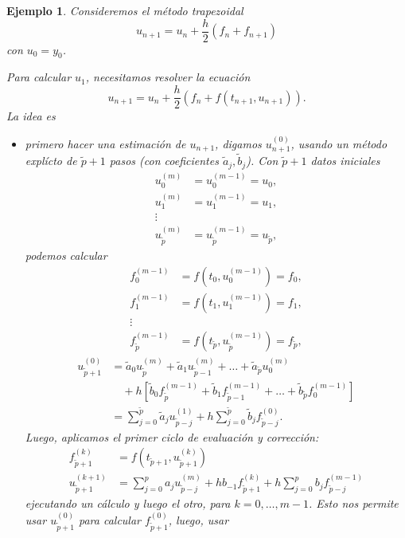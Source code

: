 \documentclass[11pt,letterpaper]{article}
\newtheorem{example}{Ejemplo}
\begin{document}
\begin{example}
  Consideremos el método trapezoidal
  \begin{equation}
    u_{n+1} = u_n + \frac{h}{2}(f_n + f_{n+1})
  \end{equation}
  con $u_0=y_0$.

  Para calcular $u_1$, necesitamos resolver la ecuación
  \begin{equation}
    u_{n+1} = u_n + \frac{h}{2}(f_n + f(t_{n+1},u_{n+1})).
  \end{equation}
  La idea es
  \begin{itemize}
    \item
      primero hacer una estimación de $u_{n+1}$, digamos
      $u_{n+1}^{(0)}$, usando un método explícto de $\tilde p+1$ pasos
      (con coeficientes $\tilde a_j, \tilde b_j$). Con $\tilde p + 1$
      datos iniciales
      \begin{align}
        u^{(m)}_0 &= u^{(m-1)}_0 = u_0, \\
        u^{(m)}_1 &= u^{(m-1)}_1 = u_1, \\
        \vdots \\
        u^{(m)}_{\tilde p} &= u^{(m-1)}_{\tilde p} = u_{\tilde p}
      ,\end{align}
      podemos calcular
      \begin{align}
        f^{(m-1)}_0 &= f(t_0,u^{(m-1)}_0) = f_0, \\
        f^{(m-1)}_1 &= f(t_1,u^{(m-1)}_1) = f_1, \\
        \vdots \\
        f^{(m-1)}_{\tilde p} &= f(t_{\tilde p},u^{(m-1)}_{\tilde p})
        = f_{\tilde p}
      ,\end{align}
      \begin{align}
        u_{\tilde p+1}^{(0)}
        &=
        \tilde a_{0} u_{\tilde p}^{(m)}
        + \tilde a_{1} u_{\tilde p - 1}^{(m)}
        + \dots +
        \tilde a_{\tilde p} u_{0}^{(m)}
        \\
        &\quad
        + h
          [
          \tilde b_0 f_{\tilde p}^{(m-1)}
          +
          \tilde b_1 f_{\tilde p-1}^{(m-1)}
          + \dots +
          \tilde b_{\tilde p} f_{0}^{(m-1)}
          ]
        \\
        &=
        \sum_{j=0}^{\tilde p}\tilde a_j u_{\tilde p-j}^{(1)}
        + h \sum_{j=0}^{\tilde p}\tilde b_j f_{\tilde p-j}^{(0)}
      .\end{align}
      Luego, aplicamos el primer ciclo de evaluación y corrección:
      \begin{align}
        f_{\tilde p + 1}^{(k)}
        &= f(t_{\tilde p+1},u_{\tilde p + 1}^{(k)})
        \\
        u_{\tilde p + 1}^{(k+1)}
        &= \sum_{j=0}^{p}a_ju_{\tilde p-j}^{(m)}
        + h b_{-1}f_{\tilde p+1}^{(k)}
        + h \sum_{j=0}^{p}b_jf_{\tilde p-j}^{(m-1)}
      \end{align}
      ejecutando un cálculo y luego el otro, para $k=0,\dots,m-1$.
      Esto nos permite usar $u_{\tilde p + 1}^{(0)}$ para calcular
      $f^{(0)}_{\tilde p + 1}$, luego, usar
      

\end{itemize}
\end{example}
\end{document}
